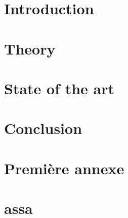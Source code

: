 \documentclass[
    iai, %
    mi, %
]{heig-tb}
\begin{document}
\maketitle
\frontmatter
\clearemptydoublepage



\preamble
\Authentication

\begin{abstract}
    
\end{abstract}

\clearemptydoublepage

{
    \tableofcontents
    \let\cleardoublepage\clearpage
    \listoffigures
    \let\cleardoublepage\clearpage
    \listoftables
    \let\cleardoublepage\clearpage
    \listoflistings
}

\printnomenclature
\clearemptydoublepage

\printglossaries
\clearemptydoublepage


\mainmatter
\chapter{Introduction}


\chapter{Theory}


\chapter{State of the art}


\chapter{Conclusion}


\clearpage
\printbibliography

\appendix
\appendixpage
\addappheadtotoc


\chapter{Première annexe}


\chapter{ assa}


\label{glossaire}
\printnoidxglossary
\label{index}
\printindex

% 
\end{document}
